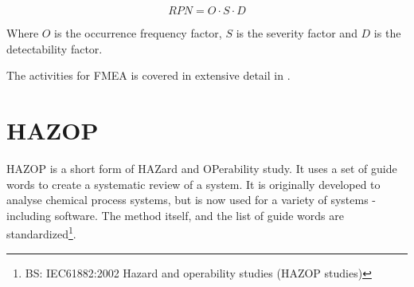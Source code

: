 \begin{equation}
RPN = O \cdot S \cdot D
\end{equation}

Where $O$ is the occurrence frequency factor, $S$ is the severity factor and $D$ is the detectability factor.

The activities for FMEA is covered in extensive detail in \cite{MILSTD1629A}.








\section{HAZOP}
HAZOP is a short form of HAZard and OPerability study. It uses a set of guide words to create a systematic review of a system. It is originally developed to analyse chemical process systems, but is now used for a variety of systems - including software. The method itself, and the list of guide words are standardized\footnote{BS: IEC61882:2002 Hazard and operability studies (HAZOP studies)}.

